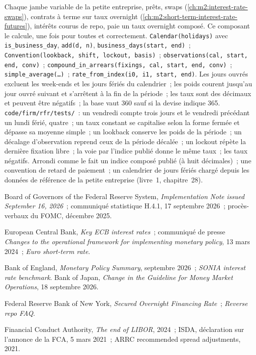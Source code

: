 \begin{build}
 Chaque jambe variable de la petite entreprise, prêts, swaps
(\cref{ch:m2:interest-rate-swaps}), contrats à terme sur taux overnight
(\cref{ch:m2:short-term-interest-rate-futures}), intérêts courus de repo, paie un
taux overnight composé. Ce composant le calcule, une fois pour toutes et correctement.
 \texttt{Calendar(holidays)} avec \texttt{is\_business\_day},
\texttt{add(d, n)}, \texttt{business\_days(start, end)}~;
\texttt{Convention(lookback, shift, lockout, basis)}~;
\texttt{observations(cal, start, end, conv)}~;
\texttt{compound\_in\_arrears(fixings, cal, start, end, conv)}~;
\texttt{simple\_average(\ldots)}~; \texttt{rate\_from\_index(i0, i1, start,
end)}.
 Les jours ouvrés excluent les week-ends et les jours fériés du calendrier~;
les poids courent jusqu'au jour ouvré suivant et s'arrêtent à la fin de la période~; les taux sont des décimaux
et peuvent être négatifs~; la base vaut 360 sauf si la devise indique 365.
 \texttt{code/firm/rfr/tests/}~: un vendredi compte
trois jours et le vendredi précédant un lundi férié, quatre~; un taux constant
se capitalise selon la forme fermée et dépasse sa moyenne simple~; un lookback
conserve les poids de la période~; un décalage d'observation reprend ceux de la
période décalée~; un lockout répète la dernière fixation libre~; la voie par
l'indice publié donne le même taux~; les taux négatifs.
 Arrondi comme le fait un indice composé publié
(à huit décimales)~; une convention de retard de paiement~; un calendrier de
jours fériés chargé depuis les données de référence de la petite entreprise (livre~1, chapitre~28).
\end{build}

\begin{omsources}
\item Board of Governors of the Federal Reserve System, \emph{Implementation Note issued September 16, 2026}~; communiqué statistique H.4.1, 17 septembre
2026~; procès-verbaux du FOMC, décembre 2025.
\item European Central Bank, \emph{Key ECB interest rates}~; communiqué de presse \emph{Changes to the operational framework for implementing monetary
policy}, 13 mars 2024~; \emph{Euro short-term rate}.
\item Bank of England, \emph{Monetary Policy Summary}, septembre 2026~; \emph{SONIA interest rate benchmark}. Bank of Japan, \emph{Change in the
Guideline for Money Market Operations}, 18 septembre 2026.
\item Federal Reserve Bank of New York, \emph{Secured Overnight Financing
Rate}~; \emph{Reverse repo FAQ}.
\item Financial Conduct Authority, \emph{The end of LIBOR}, 2024~; ISDA,
déclaration sur l'annonce de la FCA, 5 mars 2021~; ARRC recommended spread
adjustments, 2021.
\end{omsources}

